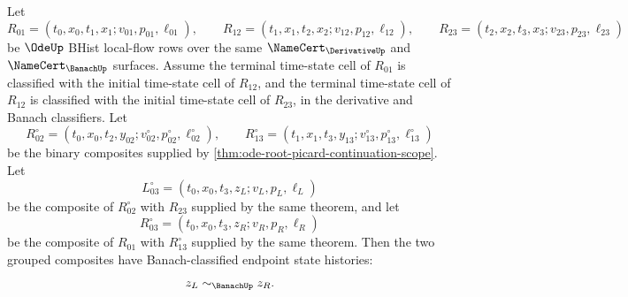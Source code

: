 \begin{theorem}
\label{thm:ode-local-flow-concatenation-associativity}
Let
$$
R_{01}=(t_0,x_0,t_1,x_1;v_{01},p_{01},\ell_{01}),\qquad
R_{12}=(t_1,x_1,t_2,x_2;v_{12},p_{12},\ell_{12}),\qquad
R_{23}=(t_2,x_2,t_3,x_3;v_{23},p_{23},\ell_{23})
$$
be $\OdeUp$ BHist local-flow rows over the same $\NameCert_{\DerivativeUp}$ and $\NameCert_{\BanachUp}$ surfaces. Assume the terminal time-state cell of $R_{01}$ is classified with the initial time-state cell of $R_{12}$, and the terminal time-state cell of $R_{12}$ is classified with the initial time-state cell of $R_{23}$, in the derivative and Banach classifiers. Let
$$
R_{02}^{\circ}=(t_0,x_0,t_2,y_{02};v_{02}^{\circ},p_{02}^{\circ},\ell_{02}^{\circ}),
\qquad
R_{13}^{\circ}=(t_1,x_1,t_3,y_{13};v_{13}^{\circ},p_{13}^{\circ},\ell_{13}^{\circ})
$$
be the binary composites supplied by \autoref{thm:ode-root-picard-continuation-scope}. Let
$$
L_{03}^{\circ}=(t_0,x_0,t_3,z_L;v_L,p_L,\ell_L)
$$
be the composite of $R_{02}^{\circ}$ with $R_{23}$ supplied by the same theorem, and let
$$
R_{03}^{\circ}=(t_0,x_0,t_3,z_R;v_R,p_R,\ell_R)
$$
be the composite of $R_{01}$ with $R_{13}^{\circ}$ supplied by the same theorem. Then the two grouped composites have Banach-classified endpoint state histories:
$$
z_L\sim_{\BanachUp} z_R.
$$
\end{theorem}
